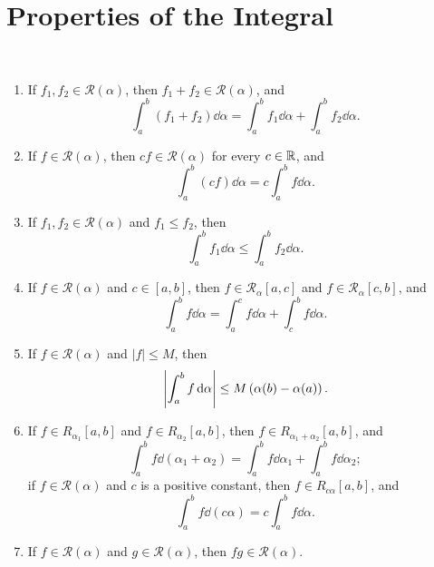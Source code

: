 \section{Properties of the Integral}
\begin{lemma}\label{lemma:integral-properties} \
\begin{enumerate}[label=(\roman*)]
\item If $f_1,f_2\in \mathcal{R}(\alpha)$, then $f_1+f_2\in \mathcal{R}(\alpha)$, and
\[\int_a^b(f_1+f_2)\dd{\alpha}=\int_a^bf_1\dd{\alpha}+\int_a^bf_2\dd{\alpha}.\]
\item If $f\in\mathcal{R}(\alpha)$, then $cf\in\mathcal{R}(\alpha)$ for every $c\in\mathbb R$, and
\[\int_a^b(cf)\dd{\alpha}=c\int_a^bf\dd{\alpha}.\]

\item If $f_1,f_2\in \mathcal{R}(\alpha)$ and $f_1\le f_2$, then
\[\int_a^bf_1\dd{\alpha}\le\int_a^bf_2\dd{\alpha}.\]

\item If $f\in \mathcal{R}(\alpha)$ and $c\in[a,b]$, then $f\in \mathcal{R}_\alpha[a,c]$ and $f\in \mathcal{R}_\alpha[c,b]$, and
\[ \int_a^b f\dd{\alpha}=\int_a^c f\dd{\alpha}+\int_c^b f\dd{\alpha}. \]

\item If $f\in \mathcal{R}(\alpha)$ and $|f|\le M$, then
\[\left|\int_a^bf\dd{\alpha}\right|\le M\left(\alpha(b)-\alpha(a)\right).\]

\item If $f\in R_{\alpha_1}[a,b]$ and $f\in R_{\alpha_2}[a,b]$, then $f\in R_{\alpha_1+\alpha_2}[a,b]$, and
\[\int_a^bf\dd{(\alpha_1+\alpha_2)}=\int_a^bf\dd{\alpha_1}+\int_a^bf\dd{\alpha_2};\]
if $f\in \mathcal{R}(\alpha)$ and $c$ is a positive constant, then $f\in R_{c\alpha}[a,b]$, and
\[\int_a^bf\dd{(c\alpha)}=c\int_a^bf\dd{\alpha}.\]

\item If $f\in \mathcal{R}(\alpha)$ and $g\in \mathcal{R}(\alpha)$, then $fg\in \mathcal{R}(\alpha)$.
\end{enumerate}
\end{lemma}

